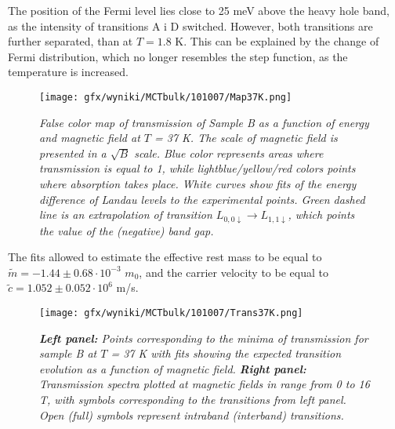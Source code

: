 \documentclass[titlepage,a4paper]{book}
\begin{document}
The position of the Fermi level lies close to 25 meV above the heavy hole band, as the intensity of transitions A i D switched. However, both transitions are further separated, than at $T = 1.8$ K. This can be explained by the change of Fermi distribution, which no longer resembles the step function, as the temperature is increased.

\begin{figure}[ht]
	\centering
	\texttt{[image: gfx/wyniki/MCTbulk/101007/Map37K.png]}
	\vspace{-10pt}
	\caption{\textit{False color map of transmission of Sample B as a function of energy and magnetic field at $T$ = 37 K. The scale of magnetic field is presented in a $\sqrt{B}$ scale. Blue color represents areas where transmission is equal to 1, while lightblue/yellow/red colors points where absorption takes place. White curves show fits of the energy difference of Landau levels to the experimental points. Green dashed line is an extrapolation of transition $L_{0,0\downarrow}\rightarrow L_{1,1\downarrow}$, which points the value of the (negative) band gap.}}
	\label{fig:Map_101007_37K}
\end{figure} 

The fits allowed to estimate the effective rest mass to be equal to $\tilde m = -1.44 \pm 0.68 \cdot 10^{-3}$ $m_0$, and the carrier velocity to be equal to $\tilde{c} = 1.052 \pm 0.052 \cdot 10^6$ m/s.

\begin{figure}[ht]
	\centering
	\texttt{[image: gfx/wyniki/MCTbulk/101007/Trans37K.png]}
	\vspace{-10pt}
	\caption{\textit{\textbf{Left panel:} Points corresponding to the minima of transmission for sample B at $T$ = 37 K with fits showing the expected transition evolution as a function of magnetic field. \textbf{Right panel:} Transmission spectra plotted at magnetic fields in range from 0 to 16 T, with symbols corresponding to the transitions from left panel. Open (full) symbols represent intraband (interband) transitions.}}
	\label{fig:Spectra_101007_37K}
\end{figure}  
\end{document}
